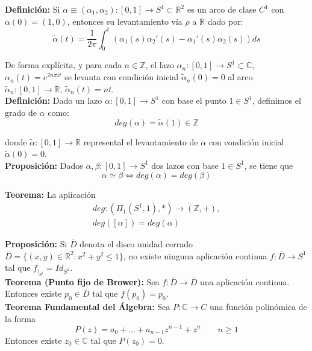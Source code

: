 \documentclass{article}
\begin{document}
\textbf{Definición:} Si $\alpha \equiv (\alpha_1,\alpha_2):[0,1]\rightarrow S^1\subset \mathbb{R}^2$ es un arco de clase $C^1$ con $\alpha(0)=(1,0)$, entonces su levantamiento vía $\rho$ a $\mathbb{R}$ dado por:
\begin{equation*}
\tilde{\alpha}(t)=\frac{1}{2\pi}\int_0^t (\alpha_1(s)\alpha_2'(s)-\alpha_1'(s)\alpha_2(s))ds
\end{equation*}

De forma explícita, y para cada $n\in \mathbb{Z}$, el lazo $\alpha_n:[0,1]\rightarrow S^1\subset \mathbb{C}$, $\alpha_n(t)=e^{2n\pi it}$ se levanta con condición inicial $\tilde{\alpha}_n(0)=0$ al arco $\tilde{\alpha}_n:[0,1]\rightarrow\mathbb{R}$, $\tilde{\alpha}_n(t)=nt$.\\

\textbf{Definición:} Dado un lazo $\alpha:[0,1]\rightarrow S^1$ con base el punto $1\in S^1$, definimos el grado de $\alpha$ como:
\begin{equation*}
deg(\alpha)=\tilde{\alpha}(1)\in \mathbb{Z}
\end{equation*}

donde $\tilde{\alpha}:[0,1]\rightarrow\mathbb{R}$ represental el levantamiento de $\alpha$ con condición inicial $\tilde{\alpha}(0)=0$.\\

\textbf{Proposición:} Dados $\alpha,\beta:[0,1]\rightarrow S^1$ dos lazos con base $1\in S^1$, se tiene que 
\begin{equation*}
\alpha\simeq \beta\Leftrightarrow deg(\alpha)=deg(\beta)
\end{equation*}

\textbf{Teorema:} La aplicación 
\begin{gather*}
deg:(\Pi_1(S^1,1),*)\rightarrow (\mathbb{Z},+),\\
deg([\alpha])=deg(\alpha)
\end{gather*}

\textbf{Proposición:} Si $\overline{D}$ denota el disco unidad cerrado $\overline{D}=\{(x,y)\in \mathbb{R}^2:x^2+y^2\leq 1\}$, no existe ninguna aplicación continua $f:\overline{D}\rightarrow S^1$ tal que $f_{|_{S^1}}=Id_{S^1}$. \\

\textbf{Teorema (Punto fijo de Brower):} Sea $f:\overline{D}\rightarrow \overline{D}$ una aplicación continua. Entonces existe $p_0\in \overline{D}$ tal que $f(p_0)=p_0$. \\

\textbf{Teorema Fundamental del Álgebra:} Sea $P:\mathbb{C}\rightarrow C$ una función polinómica de la forma
\begin{equation*}
P(z)=a_0+\ldots+a_{n-1}z^{n-1}+z^n\qquad n\geq 1
\end{equation*}
Entonces existe $z_0\in \mathbb{C}$ tal que $P(z_0)=0$.\\
\end{document}
